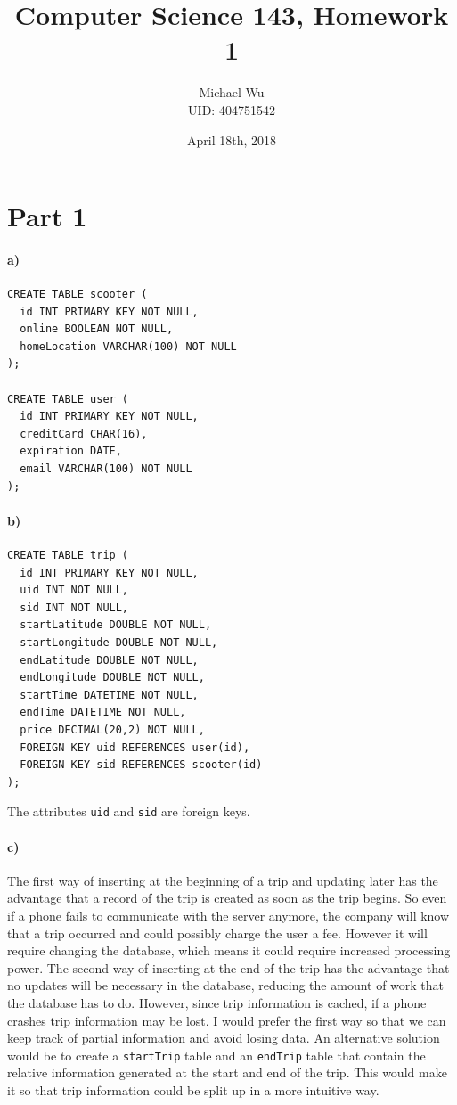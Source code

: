 \documentclass[12pt]{article}
\begin{document}
\title{Computer Science 143, Homework 1}
\date{April 18th, 2018}
\author{Michael Wu\\UID: 404751542}
\maketitle

\section*{Part 1}

\paragraph{a)}

\begin{verbatim}
CREATE TABLE scooter (
  id INT PRIMARY KEY NOT NULL,
  online BOOLEAN NOT NULL,
  homeLocation VARCHAR(100) NOT NULL
);

CREATE TABLE user (
  id INT PRIMARY KEY NOT NULL,
  creditCard CHAR(16),
  expiration DATE,
  email VARCHAR(100) NOT NULL
);
\end{verbatim}

\paragraph{b)}

\begin{verbatim}
CREATE TABLE trip (
  id INT PRIMARY KEY NOT NULL,
  uid INT NOT NULL,
  sid INT NOT NULL,
  startLatitude DOUBLE NOT NULL,
  startLongitude DOUBLE NOT NULL,
  endLatitude DOUBLE NOT NULL,
  endLongitude DOUBLE NOT NULL,
  startTime DATETIME NOT NULL,
  endTime DATETIME NOT NULL,
  price DECIMAL(20,2) NOT NULL,
  FOREIGN KEY uid REFERENCES user(id),
  FOREIGN KEY sid REFERENCES scooter(id)
);
\end{verbatim}
The attributes \texttt{uid} and \texttt{sid} are foreign keys.

\paragraph{c)}

The first way of inserting at the beginning of a trip and updating later has the advantage
that a record of the trip is created as soon as the trip begins. So even if a phone fails
to communicate with the server anymore, the company will know that a trip occurred and
could possibly charge the user a fee. However it will require changing the database, which
means it could require increased processing power. The second way of inserting at the end of the trip
has the advantage that no updates will be necessary in the database, reducing the amount of
work that the database has to do. However, since trip information is cached, if a phone crashes
trip information may be lost. I would prefer the first way so that we can keep track of partial
information and avoid losing data. An alternative solution would be to create a \texttt{startTrip}
table and an \texttt{endTrip} table that contain the relative information generated at the start
and end of the trip. This would make it so that trip information could be split up in a more intuitive
way.
\end{document}
